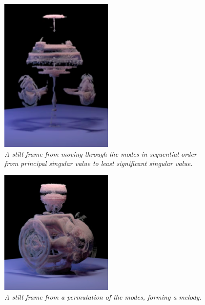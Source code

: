 \begin{figure}
	\centering
	\includegraphics[width = 0.5\textwidth]{chap5/figures/sequential_grab.png}
	\caption{\em A still frame from moving through the modes in sequential order from principal singular value to least significant singular value.}
	\label{fig:sequential}
\end{figure}

\begin{figure}
	\centering
	\includegraphics[width = 0.5\textwidth]{chap5/figures/melody_grab.png}
	\caption{\em A still frame from a permutation of the modes, forming a melody.}
	\label{fig:melody}
\end{figure}


